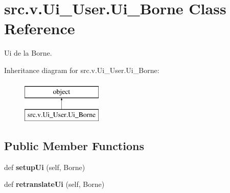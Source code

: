 \hypertarget{classsrc_1_1v_1_1_ui___user_1_1_ui___borne}{}\section{src.\+v.\+Ui\+\_\+\+User.\+Ui\+\_\+\+Borne Class Reference}
\label{classsrc_1_1v_1_1_ui___user_1_1_ui___borne}


Ui de la Borne.  


Inheritance diagram for src.\+v.\+Ui\+\_\+\+User.\+Ui\+\_\+\+Borne\+:\begin{figure}[H]
\begin{center}
\leavevmode
\includegraphics[height=2.000000cm]{classsrc_1_1v_1_1_ui___user_1_1_ui___borne}
\end{center}
\end{figure}
\subsection*{Public Member Functions}
\begin{DoxyCompactItemize}
\item 
\hypertarget{classsrc_1_1v_1_1_ui___user_1_1_ui___borne_a70bf0b79d5812579cd8bc1833e90e468}{}def {\bfseries setup\+Ui} (self, Borne)\label{classsrc_1_1v_1_1_ui___user_1_1_ui___borne_a70bf0b79d5812579cd8bc1833e90e468}

\item 
\hypertarget{classsrc_1_1v_1_1_ui___user_1_1_ui___borne_a4b86284d9bbeb8842209f20b0e90f98f}{}def {\bfseries retranslate\+Ui} (self, Borne)\label{classsrc_1_1v_1_1_ui___user_1_1_ui___borne_a4b86284d9bbeb8842209f20b0e90f98f}

\end{DoxyCompactItemize}

